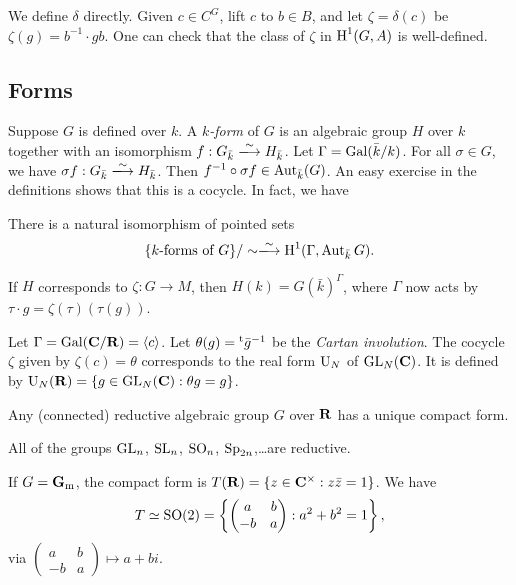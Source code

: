 We define $\delta$ directly. Given $c\in C^G$, lift $c$ to $b\in B$, and let 
$\zeta=\delta(c)$ be $\zeta(g)=b^{-1} \cdot g b$. One can check that the class 
of $\zeta$ in $\operatorname{H}^1(G,A)$ is well-defined. 





\subsection{Forms}

Suppose $G$ is defined over $k$. A \emph{$k$-form} of $G$ is an algebraic group 
$H$ over $k$ together with an isomorphism $f:G_{\bar k} \iso H_{\bar k}$. Let 
$\Gamma=\operatorname{Gal}(\bar k/k)$. For all $\sigma\in G$, we have 
$\sigma f:G_{\bar k}\iso H_{\bar k}$. Then 
$f^{-1}\circ \sigma f\in \operatorname{Aut}_{\bar k}(G)$. An easy exercise in the 
definitions shows that this is a cocycle. In fact, we have 

\begin{theo}
There is a natural isomorphism of pointed sets 
\[
  \{\text{$k$-forms of $G$}\}/\sim \iso \h^1(\Gamma,\automorphism_{\bar k} G) .
\]
\end{theo}

If $H$ corresponds to $\zeta:G\to M$, then $H(k)=G(\bar k)^\Gamma$, where 
$\Gamma$ now acts by $\tau \cdot g = \zeta(\tau)(\tau(g))$. 

\begin{example}
Let $\Gamma=\operatorname{Gal}(\mathbf{C}/\mathbf{R})=\langle c\rangle$. Let 
$\theta(g) = \prescript{\mathrm{t}}{}{\bar g}^{-1}$ be the \emph{Cartan involution}. The 
cocycle $\zeta$ given by $\zeta(c)=\theta$ corresponds to the real form 
$\operatorname{U}_N$ of $\operatorname{GL}_N(\mathbf{C})$. It is defined by 
$\operatorname{U}_N(\mathbf{R}) = \{g\in \operatorname{GL}_N(\mathbf{C}):\theta g=g\}$. 
\end{example}

\begin{theo}
Any (connected) reductive algebraic group $G$ over $\mathbf{R}$ has a unique compact 
form. 
\end{theo}

All of the groups $\operatorname{GL}_n$, $\operatorname{SL}_n$, $\operatorname{SO}_n$, 
$\operatorname{Sp}_{2 n}$,\ldots are reductive. 

\begin{example}
If $G=\mathbf{G}_{\mathrm{m}}$, the compact form is 
$T(\mathbf{R})=\{z\in \mathbf{C}^\times:z \bar z=1\}$. We have 
\[
  T\simeq \operatorname{SO}(2) = \left\{\begin{pmatrix} a & b \\ -b & a \end{pmatrix} : a^2+b^2=1\right\} ,
\]
via $\begin{pmatrix} a & b\\ -b & a \end{pmatrix} \mapsto a+b i$. 
\end{example}

